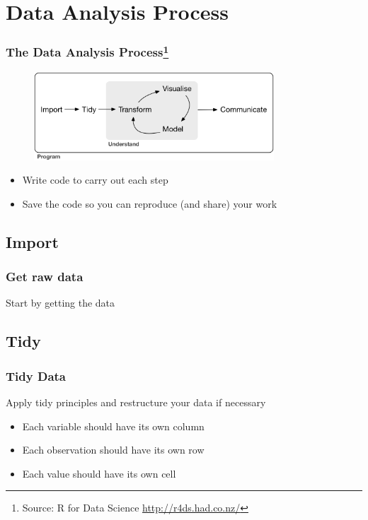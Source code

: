 \documentclass{beamer}
\begin{document}
\section{Data Analysis Process}
\begin{frame}
\frametitle{The Data Analysis Process\footnote{Source: R for Data Science \url{http://r4ds.had.co.nz/}}}


\begin{figure}
\includegraphics[width=0.8\textwidth,natwidth=610,natheight=642]{images/data-science}
\end{figure}

\begin{itemize}
\item Write code to carry out each step
\item Save the code so you can reproduce (and share) your work
\end{itemize}

\end{frame}


\subsection{Import}
\begin{frame}
\frametitle{Get raw data}
Start by getting the data
\end{frame}



\subsection{Tidy}
\begin{frame}
\frametitle{Tidy Data}
Apply tidy principles and restructure your data if necessary

\begin{itemize}
\item Each variable should have its own column
\item Each observation should have its own row
\item Each value  should have its own cell
\end{itemize}

\end{frame}
\end{document}
